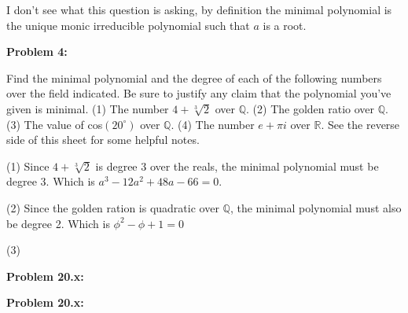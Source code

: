 \documentclass[letter paper, 12pt]{article}
\begin{document}
    I don't see what this question is asking, by definition the minimal polynomial is the unique monic irreducible polynomial such that $a$ is a root.

\noindent\textbf{Problem 4:}
    
    Find the minimal polynomial and the degree of each of the following numbers over the field indicated. Be sure to justify any claim that the polynomial you've given is minimal. (1) The number $4 + \sqrt[3]{2}$ over $\mathbb{Q}$. (2) The golden ratio over $\mathbb{Q}$. (3) The value of cos$(20^{\circ})$ over $\mathbb{Q}$. (4) The number $e + \pi i$ over $\mathbb{R}$. See the reverse side of this sheet for some helpful notes.
    
    (1) Since $4+\sqrt[3]{2}$ is degree 3 over the reals, the minimal polynomial must be degree 3. Which is $a^3 - 12a^2 + 48a -66 = 0$.
    
    (2) Since the golden ration is quadratic over $\mathbb{Q}$, the minimal polynomial must also be degree 2. Which is $\phi^2 - \phi +1 = 0$
    
    (3) 
    
\noindent\textbf{Problem 20.x:}
    
    
    
    
    
\noindent\textbf{Problem 20.x:}
    
    
    
    
    
\end{document}
